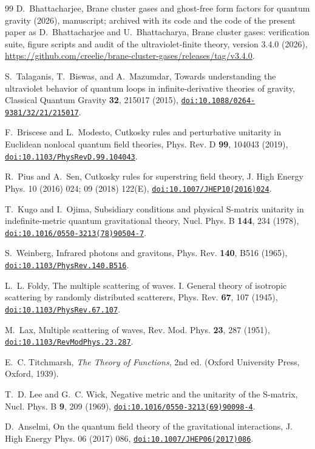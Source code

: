 \documentclass[aps,prd,10pt,twocolumn,superscriptaddress,nofootinbib,floatfix,longbibliography]{revtex4-2}
\newcommand{\doilink}[1]{\href{https://doi.org/#1}{\nolinkurl{doi:#1}}}
\begin{document}
\begin{thebibliography}{99}
D.~Bhattacharjee, Brane cluster gases and ghost-free form factors for quantum gravity (2026), manuscript; archived with its code and the code of the present paper as D.~Bhattacharjee and U.~Bhattacharya, Brane cluster gases: verification suite, figure scripts and audit of the ultraviolet-finite theory, version 3.4.0 (2026), \url{https://github.com/creelie/brane-cluster-gases/releases/tag/v3.4.0}.

S.~Talaganis, T.~Biswas, and A.~Mazumdar, Towards understanding the ultraviolet behavior of quantum loops in infinite-derivative theories of gravity, Classical Quantum Gravity \textbf{32}, 215017 (2015), \doilink{10.1088/0264-9381/32/21/215017}.

F.~Briscese and L.~Modesto, Cutkosky rules and perturbative unitarity in Euclidean nonlocal quantum field theories, Phys. Rev. D \textbf{99}, 104043 (2019), \doilink{10.1103/PhysRevD.99.104043}.

R.~Pius and A.~Sen, Cutkosky rules for superstring field theory, J. High Energy Phys. 10 (2016) 024; 09 (2018) 122(E), \doilink{10.1007/JHEP10(2016)024}.

T.~Kugo and I.~Ojima, Subsidiary conditions and physical S-matrix unitarity in indefinite-metric quantum gravitational theory, Nucl. Phys. B \textbf{144}, 234 (1978), \doilink{10.1016/0550-3213(78)90504-7}.

S.~Weinberg, Infrared photons and gravitons, Phys. Rev. \textbf{140}, B516 (1965), \doilink{10.1103/PhysRev.140.B516}.

L.~L. Foldy, The multiple scattering of waves. I. General theory of isotropic scattering by randomly distributed scatterers, Phys. Rev. \textbf{67}, 107 (1945), \doilink{10.1103/PhysRev.67.107}.

M.~Lax, Multiple scattering of waves, Rev. Mod. Phys. \textbf{23}, 287 (1951), \doilink{10.1103/RevModPhys.23.287}.

E.~C. Titchmarsh, \emph{The Theory of Functions}, 2nd ed. (Oxford University Press, Oxford, 1939).

T.~D. Lee and G.~C. Wick, Negative metric and the unitarity of the S-matrix, Nucl. Phys. B \textbf{9}, 209 (1969), \doilink{10.1016/0550-3213(69)90098-4}.

D.~Anselmi, On the quantum field theory of the gravitational interactions, J. High Energy Phys. 06 (2017) 086, \doilink{10.1007/JHEP06(2017)086}.


\end{thebibliography}
\end{document}
